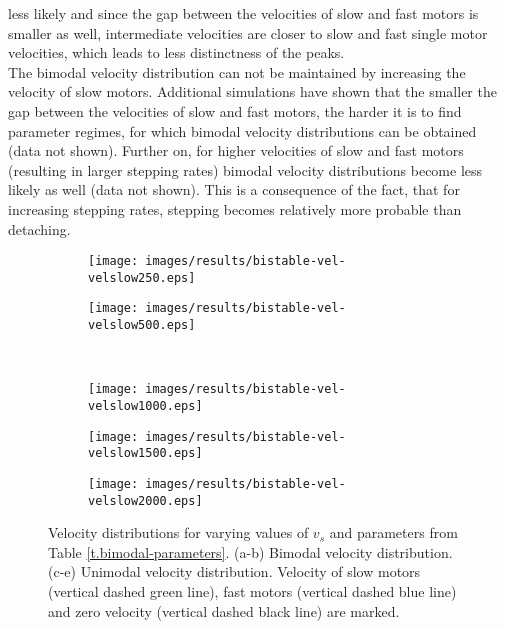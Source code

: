 less likely and since the gap between the velocities of slow and fast motors is smaller as well, intermediate velocities are closer to slow and fast single motor velocities, which leads to
less distinctness of the peaks. \\
The bimodal velocity distribution can not be maintained by increasing the velocity of slow motors. Additional simulations have shown that the smaller the gap between the velocities of slow and fast
motors, the harder it is to find parameter regimes, for which bimodal velocity distributions can be obtained (data not shown). Further on, for higher velocities of slow and fast motors (resulting in larger stepping rates) bimodal
velocity distributions become less likely as well (data not shown). This is a consequence of the fact, that for increasing stepping rates, stepping becomes relatively more probable than detaching.

\begin{figure}
\centering
\begin{subfigure}{0.3\textwidth}
 \texttt{[image: images/results/bistable-vel-velslow250.eps]}
\end{subfigure}
\begin{subfigure}{0.3\textwidth}
 \texttt{[image: images/results/bistable-vel-velslow500.eps]}
\end{subfigure}\\
\begin{subfigure}{0.3\textwidth}
 \texttt{[image: images/results/bistable-vel-velslow1000.eps]}
\end{subfigure}
\begin{subfigure}{0.3\textwidth}
 \texttt{[image: images/results/bistable-vel-velslow1500.eps]}
\end{subfigure}
\begin{subfigure}{0.3\textwidth}
 \texttt{[image: images/results/bistable-vel-velslow2000.eps]}
\end{subfigure}

\caption[Influence of velocity of slow motors $v_s$ on bimodal velocity distribution]{Velocity distributions for varying values of $v_s$ and parameters from Table \ref{t.bimodal-parameters}. (a-b) Bimodal velocity distribution. (c-e) Unimodal velocity distribution. Velocity of slow motors (vertical dashed green line), fast motors (vertical dashed blue line) and zero velocity (vertical dashed black line) are marked.} 
\label{img.bimodal-velslow-comparison}
\end{figure}


